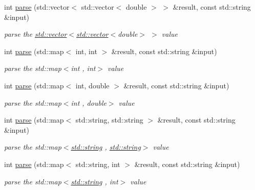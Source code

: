 \begin{DoxyCompactItemize}
int \hyperlink{namespace_d_d4hep_1_1_parsers_aaec3e97d2c62b4ca583b113b7c55e44c}{parse} (std::vector$<$ std::vector$<$ double $>$ $>$ \&result, const std::string \&input)
\begin{DoxyCompactList}\small\item\em parse the {\ttfamily \hyperlink{classstd_1_1vector}{std::vector}$<$\hyperlink{classstd_1_1vector}{std::vector}$<$double$>$ $>$} value \item\end{DoxyCompactList}\item 
int \hyperlink{namespace_d_d4hep_1_1_parsers_ac82777050fc05e43dcd2e5fa4648cfb5}{parse} (std::map$<$ int, int $>$ \&result, const std::string \&input)
\begin{DoxyCompactList}\small\item\em parse the {\ttfamily std::map$<$int , int$>$} value \item\end{DoxyCompactList}\item 
int \hyperlink{namespace_d_d4hep_1_1_parsers_a948c73c7e48e93c657c717952295ce22}{parse} (std::map$<$ int, double $>$ \&result, const std::string \&input)
\begin{DoxyCompactList}\small\item\em parse the {\ttfamily std::map$<$int , double$>$} value \item\end{DoxyCompactList}\item 
int \hyperlink{namespace_d_d4hep_1_1_parsers_a5c68b3129b287e0e4c0a8aa6c97224d2}{parse} (std::map$<$ std::string, std::string $>$ \&result, const std::string \&input)
\begin{DoxyCompactList}\small\item\em parse the {\ttfamily std::map$<$\hyperlink{classstd_1_1string}{std::string} , \hyperlink{classstd_1_1string}{std::string}$>$} value \item\end{DoxyCompactList}\item 
int \hyperlink{namespace_d_d4hep_1_1_parsers_a0bb67dd0bd4f1932c18d9fdf190b0387}{parse} (std::map$<$ std::string, int $>$ \&result, const std::string \&input)
\begin{DoxyCompactList}\small\item\em parse the {\ttfamily std::map$<$\hyperlink{classstd_1_1string}{std::string} , int$>$} value \item\end{DoxyCompactList}\item 

\end{DoxyCompactItemize}
